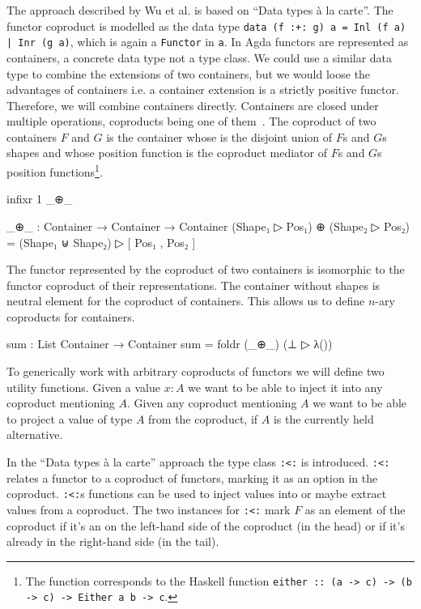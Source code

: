 The approach described by Wu et al. is based on ``Data types {\`{a}} la
carte''\cite{DBLP:journals/jfp/Swierstra08}.
The functor coproduct is modelled as the data type \texttt{data (f
:+: g) a = Inl (f a) | Inr (g a)}, which is again a \texttt{Functor} in
\texttt{a}.
In Agda functors are represented as containers, a concrete data type not a type
class.
We could use a similar data type to combine the extensions of two containers,
but we would loose the advantages of containers i.e. a container extension is a
strictly positive functor.
Therefore, we will combine containers directly.
Containers are closed under multiple operations, coproducts being one of
them~\cite{DBLP:conf/fossacs/AbbottAG03}.
The coproduct of two containers $F$ and $G$ is the container whose
 is the disjoint union of $F$s and $G$s shapes and whose
position function  is the coproduct mediator of $F$s and $G$s
position functions\footnote{The function \AgdaFunction{[\_,\_]} corresponds to
  the Haskell function \texttt{either :: (a -> c) -> (b -> c) ->
    Either a b -> c}.}.

\begin{code}[hide]
infixr 1 _⊕_
\end{code}
\begin{code}
_⊕_ : Container → Container → Container
(Shape₁ ▷ Pos₁) ⊕ (Shape₂ ▷ Pos₂) = (Shape₁ ⊎ Shape₂) ▷ [ Pos₁ , Pos₂ ]
\end{code}
The functor represented by the coproduct of two containers is isomorphic to the
functor coproduct of their representations.
The container without shapes is neutral element for the coproduct of containers.
This allows us to define $n$-ary coproducts for containers.

\begin{code}
sum : List Container → Container
sum  = foldr (_⊕_) (⊥ ▷ λ())
\end{code}
To generically work with arbitrary coproducts of functors we will define two
utility functions.
Given a value $x:A$ we want to be able to inject it into any coproduct
mentioning $A$.
Given any coproduct mentioning $A$ we want to be able to project a value of
type $A$ from the coproduct, if $A$ is the currently held alternative.

In the ``Data types {\`{a}} la carte''\cite{DBLP:journals/jfp/Swierstra08}
approach the type class \texttt{:<:} is introduced.
\texttt{:<:} relates a functor to a coproduct of functors, marking it as an
option in the coproduct.
\texttt{:<:}s functions can be used to inject values into or maybe extract
values from a coproduct.
The two instances for \texttt{:<:} mark $F$ as an element of the coproduct if
it's an on the left-hand side of the coproduct (in the head) or if it's already
in the right-hand side (in the tail).

